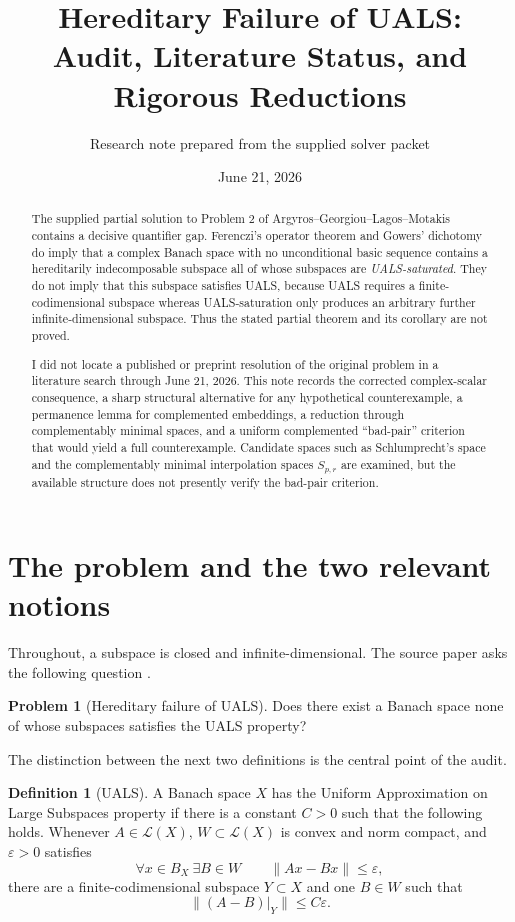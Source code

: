 \documentclass[11pt]{article}
\title{Hereditary Failure of UALS:\\Audit, Literature Status, and Rigorous Reductions}
\author{Research note prepared from the supplied solver packet}
\date{June 21, 2026}
\theoremstyle{definition}
\newtheorem{definition}[theorem]{Definition}
\newtheorem{problem}[theorem]{Problem}
\theoremstyle{remark}
\newcommand{\LL}{\mathcal{L}}
\begin{document}
\maketitle

\begin{abstract}
The supplied partial solution to Problem 2 of Argyros--Georgiou--Lagos--Motakis contains a decisive quantifier gap.  Ferenczi's operator theorem and Gowers' dichotomy do imply that a complex Banach space with no unconditional basic sequence contains a hereditarily indecomposable subspace all of whose subspaces are \emph{UALS-saturated}.  They do not imply that this subspace satisfies UALS, because UALS requires a finite-codimensional subspace whereas UALS-saturation only produces an arbitrary further infinite-dimensional subspace.  Thus the stated partial theorem and its corollary are not proved.

I did not locate a published or preprint resolution of the original problem in a literature search through June 21, 2026.  This note records the corrected complex-scalar consequence, a sharp structural alternative for any hypothetical counterexample, a permanence lemma for complemented embeddings, a reduction through complementably minimal spaces, and a uniform complemented ``bad-pair'' criterion that would yield a full counterexample.  Candidate spaces such as Schlumprecht's space and the complementably minimal interpolation spaces $S_{p,r}$ are examined, but the available structure does not presently verify the bad-pair criterion.
\end{abstract}

\section{The problem and the two relevant notions}

Throughout, a subspace is closed and infinite-dimensional.  The source paper asks the following question \cite[Problem 2]{AGLM}.

\begin{problem}[Hereditary failure of UALS]\label{prob:source}
Does there exist a Banach space none of whose subspaces satisfies the UALS property?
\end{problem}

The distinction between the next two definitions is the central point of the audit.

\begin{definition}[UALS]\label{def:uals}
A Banach space $X$ has the Uniform Approximation on Large Subspaces property if there is a constant $C>0$ such that the following holds.  Whenever $A\in\LL(X)$, $W\subset\LL(X)$ is convex and norm compact, and $\varepsilon>0$ satisfies
\[
  \forall x\in B_X\ \exists B\in W\qquad \|Ax-Bx\|\leq \varepsilon,
\]
there are a finite-codimensional subspace $Y\subset X$ and one $B\in W$ such that
\[
  \|(A-B)|_Y\|\leq C\varepsilon.
\]
\end{definition}
\end{document}
